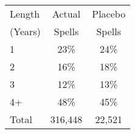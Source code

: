 \begin{tabular}{lcc}
\toprule
Length & Actual & Placebo \\
(Years) & Spells & Spells \\
\midrule
1 & 23\% & 24\% \\
2 & 16\% & 18\% \\
3 & 12\% & 13\% \\
4+ & 48\% & 45\% \\
Total &      316,448 &       22,521 \\
\bottomrule
\end{tabular}
